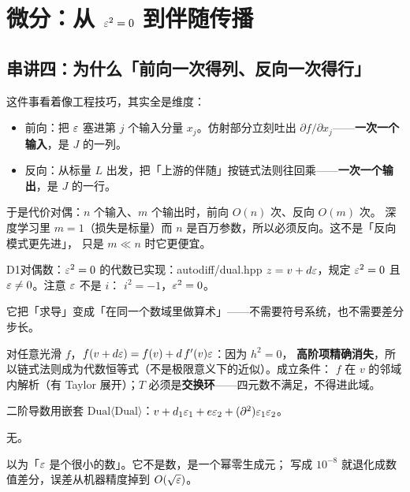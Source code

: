 \section{微分：从 $\varepsilon^{2}=0$ 到伴随传播}

\subsection*{串讲四：为什么「前向一次得列、反向一次得行」}

这件事看着像工程技巧，其实全是维度：

\begin{itemize}[leftmargin=1.4em]
  \item 前向：把 $\varepsilon$ 塞进第 $j$ 个输入分量 $x_j$。仿射部分立刻吐出
        $\partial f/\partial x_j$——\textbf{一次一个输入}，是 $J$ 的一列。
  \item 反向：从标量 $L$ 出发，把「上游的伴随」按链式法则往回乘——\textbf{一次一个输出}，是 $J$ 的一行。
\end{itemize}

于是代价对偶：$n$ 个输入、$m$ 个输出时，前向 $O(n)$ 次、反向 $O(m)$ 次。
深度学习里 $m=1$（损失是标量）而 $n$ 是百万参数，所以必须反向。这不是「反向模式更先进」，
只是 $m\ll n$ 时它更便宜。

\begin{know}{D1}{对偶数：$\varepsilon^{2}=0$ 的代数}{已实现：autodiff/dual.hpp}
 $z=v+d\varepsilon$，规定 $\varepsilon^{2}=0$ 且 $\varepsilon\ne0$。注意 $\varepsilon$ 不是 $i$：
$i^{2}=-1$，$\varepsilon^{2}=0$。

 它把「求导」变成「在同一个数域里做算术」——不需要符号系统，也不需要差分步长。

 对任意光滑 $f$，$f(v+d\varepsilon)=f(v)+d\,f'(v)\varepsilon$：因为 $h^{2}=0$，
\textbf{高阶项精确消失}，所以链式法则成为代数恒等式（不是极限意义下的近似）。成立条件：
$f$ 在 $v$ 的邻域内解析（有 Taylor 展开）；$T$ 必须是\textbf{交换环}——四元数不满足，不得进此域。

 二阶导数用嵌套 $\mathrm{Dual\langle Dual\rangle}$：$v+d_1\varepsilon_1+e\varepsilon_2+(\partial^{2})\varepsilon_1\varepsilon_2$。

 无。

 以为「$\varepsilon$ 是个很小的数」。它不是数，是一个幂零生成元；
写成 $10^{-8}$ 就退化成数值差分，误差从机器精度掉到 $O(\sqrt{\varepsilon})$。
\end{know}

